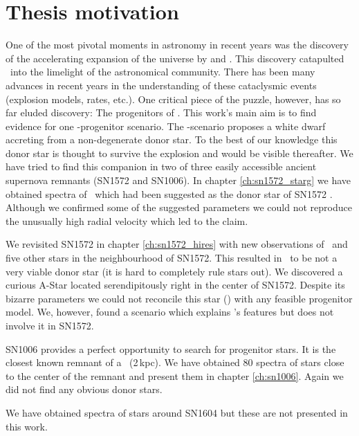 \newpage
\section{Thesis motivation}
One of the most pivotal moments in astronomy in recent years was the discovery of the accelerating expansion of the universe by \citet{1998AJ....116.1009R} and \citet{1999ApJ...517..565P}. This discovery catapulted \sneia\ into the limelight of the astronomical community. There has been many advances in recent years in the understanding of these cataclysmic events (explosion models, rates, etc.). One critical piece of the puzzle, however, has so far eluded discovery: The progenitors of \sneia. This work's main aim is to find evidence for one \snia-progenitor scenario. The \sd-scenario proposes a white dwarf accreting from a non-degenerate donor star. To the best of our knowledge this donor star is thought to survive the explosion and would be visible thereafter. We have tried to find this companion in two of three easily accessible ancient supernova remnants (SN1572 and SN1006). 
In chapter \ref{ch:sn1572_starg} we have obtained spectra of \starg\ which had been suggested as the donor star of SN1572 \citep{2004Natur.431.1069R}. Although we confirmed some of the suggested parameters we could not reproduce the unusually high radial velocity which led to the claim. 

We revisited SN1572 in chapter \ref{ch:sn1572_hires} with new observations of \starg\ and five other stars in the neighbourhood of SN1572. This resulted in \starg\ to be not a very viable donor star (it is hard to completely rule stars out). We discovered a curious A-Star located serendipitously right in the center of SN1572. Despite its bizarre parameters we could not reconcile this star (\starb) with any feasible progenitor model. We, however, found a scenario which explains \starb's features but does not involve it in SN1572. 

SN1006 provides a perfect opportunity to search for progenitor stars. It is the closest known remnant of a \snia\ (2\,kpc). We have obtained 80 spectra of stars close to the center of the remnant and present them in chapter \ref{ch:sn1006}. Again we did not find any obvious donor stars. 

We have obtained spectra of stars around SN1604 but these are not presented in this work.

